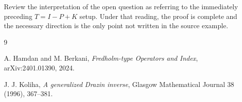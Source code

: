 \documentclass[11pt]{article}
\begin{document}
Review the interpretation of the open question as referring to the immediately
preceding \(T=I-P+K\) setup.  Under that reading, the proof is complete and
the necessary direction is the only point not written in the source example.

\begin{thebibliography}{9}

A. Hamdan and M. Berkani,
\emph{Fredholm-type Operators and Index},
arXiv:2401.01390, 2024.

J. J. Koliha,
\emph{A generalized Drazin inverse},
Glasgow Mathematical Journal 38 (1996), 367--381.

\end{thebibliography}
\end{document}
